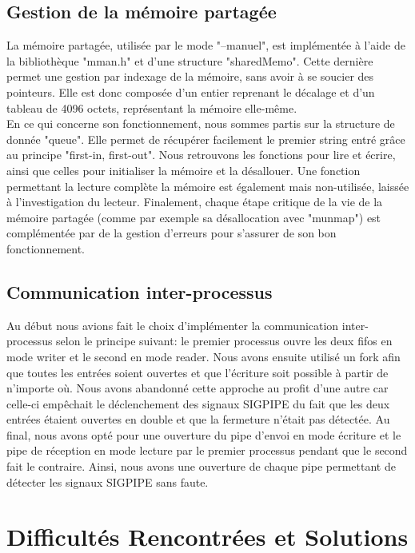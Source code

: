 \documentclass[utf8]{article}
\begin{document}
\subsection{Gestion de la mémoire partagée}
La mémoire partagée, utilisée par le mode "--manuel", est implémentée à l'aide de la bibliothèque "mman.h" et d'une structure "sharedMemo". Cette dernière permet une gestion
par indexage de la mémoire, sans avoir à se soucier des pointeurs. Elle est donc composée d'un entier reprenant le décalage et d'un tableau de 4096 octets,
représentant la mémoire elle-même. \\En ce qui concerne son fonctionnement, nous sommes partis sur la structure de donnée "queue". Elle
permet de récupérer facilement le premier string entré grâce au principe "first-in, first-out". Nous retrouvons les fonctions pour lire et écrire, ainsi
que celles pour initialiser la mémoire et la désallouer. Une fonction permettant la lecture complète la mémoire est également mais non-utilisée, laissée à l'investigation du lecteur.
Finalement, chaque étape critique de la vie de la mémoire partagée (comme par exemple sa désallocation avec "munmap") est complémentée par de la gestion d'erreurs pour s'assurer de son bon fonctionnement.

\subsection{Communication inter-processus}
Au début nous avions fait le choix d'implémenter la communication inter-processus selon le principe suivant: le premier processus ouvre les deux fifos en mode writer et le second en mode reader.
Nous avons ensuite utilisé un fork afin que toutes les entrées soient ouvertes et que l'écriture soit possible à partir de n'importe où.
Nous avons abandonné cette approche au profit d'une autre car celle-ci empêchait le déclenchement des signaux SIGPIPE du fait que les deux entrées 
étaient ouvertes en double et que la fermeture n'était pas détectée. Au final, nous avons opté pour une ouverture du pipe d'envoi en mode écriture et le pipe de 
réception en mode lecture par le premier processus pendant que le second fait le contraire. Ainsi, nous avons une ouverture de chaque pipe permettant de détecter 
les signaux SIGPIPE sans faute.
 

\newpage
\section{Difficultés Rencontrées et Solutions}
\end{document}
